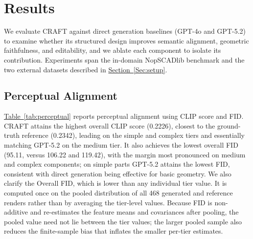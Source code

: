\documentclass[conference]{IEEEtran}
\newcommand{\colref}[2]{\hyperref[#2]{#1~\ref*{#2}}}
\newcommand{\secref}[1]{\colref{Section}{#1}}
\newcommand{\tabref}[1]{\colref{Table}{#1}}
\begin{document}
\section{Results}
\label{Sec:results}

We evaluate CRAFT against direct generation baselines (GPT-4o and GPT-5.2) to examine whether its structured design improves semantic alignment, geometric faithfulness, and editability, and we ablate each component to isolate its contribution. Experiments span the in-domain NopSCADlib benchmark and the two external datasets described in \secref{Sec:setup}.

\subsection{Perceptual Alignment}

\tabref{tab:perceptual} reports perceptual alignment using CLIP score and FID. CRAFT attains the highest overall CLIP score (0.2226), closest to the ground-truth reference (0.2342), leading on the simple and complex tiers and essentially matching GPT-5.2 on the medium tier. It also achieves the lowest overall FID (95.11, versus 106.22 and 119.42), with the margin most pronounced on medium and complex components; on simple parts GPT-5.2 attains the lowest FID, consistent with direct generation being effective for basic geometry. We also clarify the Overall FID, which is lower than any individual tier value. It is computed once on the pooled distribution of all 468 generated and reference renders rather than by averaging the tier-level values. Because FID is non-additive and re-estimates the feature means and covariances after pooling, the pooled value need not lie between the tier values; the larger pooled sample also reduces the finite-sample bias that inflates the smaller per-tier estimates.
\end{document}
